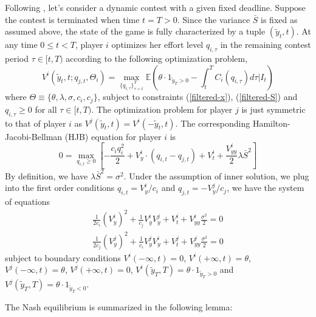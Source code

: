 \documentclass[a4paper, 11pt]{article}
\theoremstyle{plain} %
\begin{document}
Following \cite{ryvkin2022fight}, let's consider a dynamic contest with a given fixed deadline. 
Suppose the contest is terminated when time $t=T>0$. 
Since the variance $\bar{S}$ is fixed as assumed above, the state of the game is fully characterized by a tuple $(\tilde{y}_t, t)$. 
At any time $0\le t<T$, player $i$ optimizes her effort level $q_{i,\tau}$ in the remaining contest period $\tau\in[t, T)$ according to the following optimization problem, 
\begin{equation}\label{v-def}
	V^i(\tilde{y}_{t}, t ; q_{j,t},\Theta_i) = \max_{\{q_{i,\tau}\}^T_{\tau=t}} 
	\mathbb{E}\left( \theta\cdot1_{\tilde{y}_T>0} - \int^T_tC_i(q_{i,\tau})d\tau \bigg|I_t\right) 
\end{equation}
where $\Theta \equiv\{\theta, \lambda, \sigma, c_i, c_j\}$, subject to constraints (\ref{filtered-x}), (\ref{filtered-S}) and $q_{i,\tau}\ge0$ for all $\tau\in[t,T)$.
The optimization problem for player $j$ is just symmetric to that of player $i$ as $V^j(\tilde{y}_t, t) = V^i(-\tilde{y}_t, t)$. 
The corresponding Hamilton-Jacobi-Bellman (HJB) equation for player $i$ is 
\begin{equation*}
0 = \max_{q_{i,t}\ge0}\left[-\frac{c_iq_i^2}{2} + V^i_{y}\cdot\left(q_{i,t}-q_{j,t}\right)+V^i_t + \frac{V^i_{yy}}{2}\lambda \bar{S}^2\right]
\end{equation*}
By definition, we have $\lambda \bar{S}^2 = \sigma^2$. 
Under the assumption of inner solution, we plug into the first order conditions $q_{i,t} = V^i_y/c_i$ and $q_{j,t} = -V^j_y/c_j$, we have the system of equations
\begin{equation*}
\begin{aligned}
\frac{1}{2c_i}(V^i_y)^2 + \frac{1}{c_j}V^i_yV^j_y + V^i_t + V^i_{yy}\frac{\sigma^2}{2} = 0\\
\frac{1}{2c_j}(V^j_y)^2 + \frac{1}{c_i}V^j_yV^i_y + V^j_t + V^j_{yy}\frac{\sigma^2}{2} = 0
\end{aligned}
\end{equation*}
subject to boundary conditions $V^i(-\infty, t) = 0$, $V^i(+\infty, t) = \theta$, $V^j(-\infty, t) = \theta$, $V^j(+\infty, t)=0$, $V^i(\tilde{y}_T, T) = \theta \cdot 1_{\tilde{y}_T > 0}$ and $V^j(\tilde{y}_T, T) = \theta \cdot 1_{\tilde{y}_T < 0}$. 


The Nash equilibrium is summarized in the following lemma: 
\end{document}
